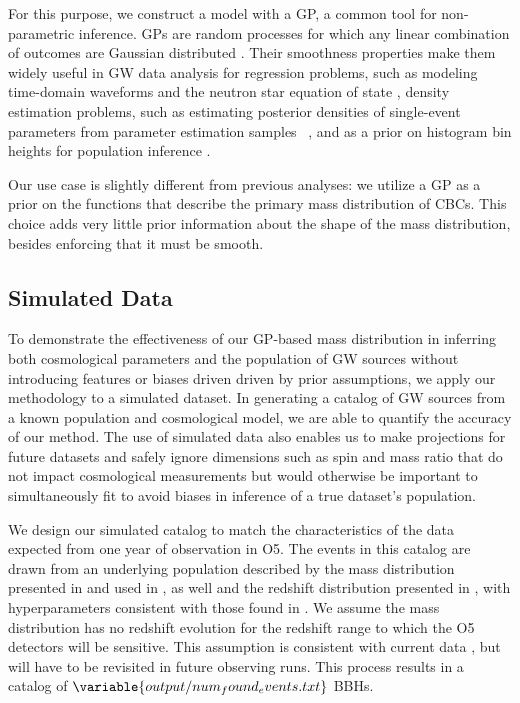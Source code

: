 \documentclass[preprint2,linenumbers]{aastex631}
\begin{document}
For this purpose, we construct a model with a \acf{GP}, a common tool for non-parametric inference. 
\Acp{GP} are random processes for which any linear combination of outcomes are Gaussian distributed \citep{rasmussen_gaussian_2006}.
Their smoothness properties make them widely useful in \ac{GW} data analysis for regression problems, such as modeling time-domain waveforms \citep{doctor_statistical_2017, huerta_eccentric_2018} and the neutron star equation of state \citep{landry_nonparametric_2019}, density estimation problems, such as estimating posterior densities of single-event parameters from parameter estimation samples ~\citep{demilio_density_2021}, and as a prior on histogram bin heights for population inference \citep{mandel_model-independent_2017, li_flexible_2021, ray_non-parametric_2023}.

Our use case is slightly different from previous analyses:
we utilize a \ac{GP} as a prior on the functions that describe the primary mass distribution of \acp{CBC}.
This choice adds very little prior information about the shape of the mass distribution, besides enforcing that it must be smooth.

\subsection{Simulated Data}
To demonstrate the effectiveness of our \ac{GP}-based mass distribution in inferring both cosmological parameters and the population of \ac{GW} sources without introducing features or biases driven driven by prior assumptions, we apply our methodology to a simulated dataset.
In generating a catalog of \ac{GW} sources from a known population and cosmological model, we are able to quantify the accuracy of our method.
The use of simulated data also enables us to make projections for future datasets and safely ignore dimensions such as spin and mass ratio that do not impact cosmological measurements but would otherwise be important to simultaneously fit to avoid biases in inference of a true dataset's population.

We design our simulated catalog to match the characteristics of the data expected from one year of observation in \ac{O5}. 
The events in this catalog are drawn from an underlying population described by the \plp{} mass distribution presented in \citet{talbot_measuring_2018} and used in \citet{abbott_binary_2019, abbott_population_2023}, as well and the redshift distribution presented in \citet{callister_shouts_2020}, with hyperparameters consistent with those found in \citet{abbott_population_2023}.
We assume the mass distribution has no redshift evolution for the redshift range to which the \ac{O5} detectors will be sensitive. 
This assumption is consistent with current data \citep{fishbach_when_2021,van_son_redshift_2022,abbott_population_2023}, but will have to be revisited in future observing runs.
This process results in a catalog of $\variable{output/num_found_events.txt}$ \acp{BBH}.
\end{document}
